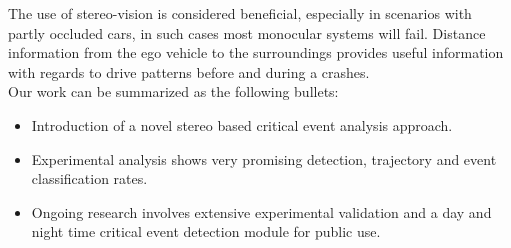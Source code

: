 \begin{multicols}{2}  
The use of stereo-vision is considered beneficial, especially in scenarios with partly occluded cars, in such cases most monocular systems will fail. Distance information from the ego vehicle to the surroundings provides useful information with regards to drive patterns before and during a crashes. \\

Our work can be summarized as the following bullets:
\begin{itemize}
\item Introduction of a novel stereo based critical event analysis approach.
\item Experimental analysis shows very promising detection, trajectory and event classification rates.
\item Ongoing research involves extensive experimental validation and a day and night time critical event detection module for public use.
\end{itemize}
\end{multicols}



